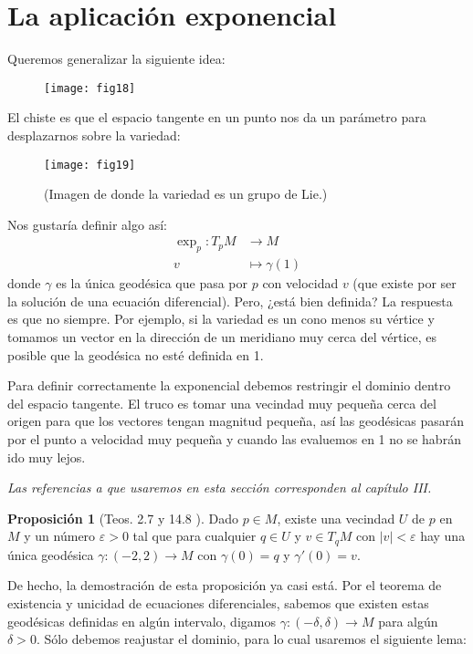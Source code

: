 \documentclass[spanish]{book}
\theoremstyle{definition}
\newtheorem*{prop}{Proposición}
\begin{document}
	\section{La aplicación exponencial}
	Queremos generalizar la siguiente idea:
	
	\begin{figure}[H]
		\centering
		\texttt{[image: fig18]}
	\end{figure}
	El chiste es que el espacio tangente en un punto nos da un parámetro para desplazarnos sobre la variedad:
	
	\begin{figure}[H]
		\centering
		\texttt{[image: fig19]}
		\caption*{(Imagen de \cite{Lee} donde la variedad es un grupo de Lie.)
		}
	\end{figure}
	Nos gustaría definir algo así:
	\begin{align*}
		\exp_p:T_pM&\to M\\
		v&\mapsto \gamma(1)
	\end{align*}
	donde $\gamma$ es la única geodésica que pasa por $p$ con velocidad $v$ (que existe por ser la solución de una ecuación diferencial). Pero, ¿está bien definida? La respuesta es que no siempre. Por ejemplo, si la variedad es un cono menos su vértice y tomamos un vector en la dirección de un meridiano muy cerca del vértice, es posible que la geodésica no esté definida en 1.
	
	Para definir correctamente la exponencial debemos restringir el dominio dentro del espacio tangente. El truco es tomar una vecindad muy pequeña cerca del origen para que los vectores tengan magnitud pequeña, así las geodésicas pasarán por el punto a velocidad muy pequeña y cuando las evaluemos en 1 no se habrán ido muy lejos.
	
	\textit{Las referencias a \cite{DoCarmo} que usaremos en esta sección corresponden al capítulo III.}
	
	\begin{prop}[Teos. 2.7 \cite{DoCarmo} y 14.8 \cite{Loring-dif}]
		Dado $p\in M$, existe una vecindad $U$ de $p$ en $M$ y un número $\varepsilon>0$ tal que para cualquier $q\in U$ y $v\in T_qM$ con $|v|<\varepsilon$ hay una única geodésica $\gamma:(-2,2)\to M$ con $\gamma(0)=q$ y $\gamma'(0)=v$.
	\end{prop}
	De hecho, la demostración de esta proposición ya casi está. Por el teorema de existencia y unicidad de ecuaciones diferenciales, sabemos que existen estas geodésicas definidas en algún intervalo, digamos $\gamma:(-\delta,\delta)\to M$ para algún $\delta>0$. Sólo debemos reajustar el dominio, para lo cual usaremos el siguiente lema:
	
\end{document}
